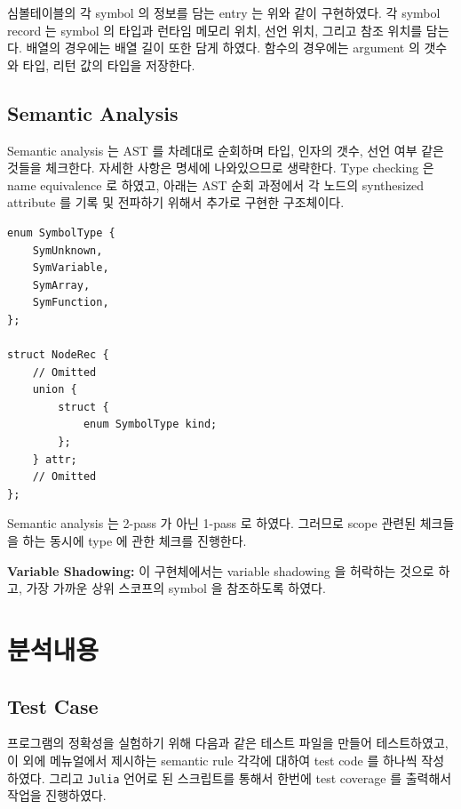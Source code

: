 \documentclass[a4paper, 12p]{paper}
\def\code#1{\texttt{#1}}
\begin{document}
심볼테이블의 각 symbol 의 정보를 담는 entry 는 위와 같이 구현하였다. 각 symbol record 는 symbol 의 타입과 런타임 메모리 위치, 선언 위치, 그리고 참조 위치를 담는다. 배열의 경우에는 배열 길이 또한 담게 하였다. 함수의 경우에는 argument 의 갯수와 타입, 리턴 값의 타입을 저장한다.

\subsection{Semantic Analysis}

Semantic analysis 는 AST 를 차례대로 순회하며 타입, 인자의 갯수, 선언 여부 같은 것들을 체크한다. 자세한 사항은 명세에 나와있으므로 생략한다. Type checking 은 name equivalence 로 하였고, 아래는 AST 순회 과정에서 각 노드의 synthesized attribute 를 기록 및 전파하기 위해서 추가로 구현한 구조체이다. 

\begin{verbatim}
enum SymbolType {
    SymUnknown,
    SymVariable,
    SymArray,
    SymFunction,
};

struct NodeRec {
    // Omitted
    union {
        struct {
            enum SymbolType kind;
        };
    } attr;
    // Omitted
};
\end{verbatim}

Semantic analysis 는 2-pass 가 아닌 1-pass 로 하였다. 그러므로 scope 관련된 체크들을 하는 동시에 type 에 관한 체크를 진행한다.

\noindent\textbf{Variable Shadowing:} 이 구현체에서는 variable shadowing 을 허락하는 것으로 하고, 가장 가까운 상위 스코프의 symbol 을 참조하도록 하였다.

\section{분석내용}
\subsection{Test Case}\label{case}
프로그램의 정확성을 실험하기 위해 다음과 같은 테스트 파일을 만들어 테스트하였고, 이 외에 메뉴얼에서 제시하는 semantic rule 각각에 대하여 test code 를 하나씩 작성하였다. 그리고 \code{Julia} 언어로 된 스크립트를 통해서 한번에 test coverage 를 출력해서 작업을 진행하였다.
\end{document}
